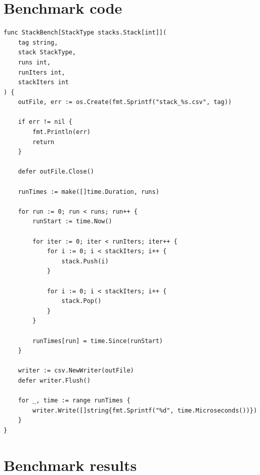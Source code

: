 \documentclass[a4paper,11pt]{article}
\begin{document}
    \begin{appendices}
        \section{Benchmark code}
        \label{appendix:benchmark_code}

        \begin{verbatim}
func StackBench[StackType stacks.Stack[int]](
    tag string,
    stack StackType,
    runs int,
    runIters int,
    stackIters int
) {
    outFile, err := os.Create(fmt.Sprintf("stack_%s.csv", tag))

    if err != nil {
        fmt.Println(err)
        return
    }

    defer outFile.Close()

    runTimes := make([]time.Duration, runs)

    for run := 0; run < runs; run++ {
        runStart := time.Now()

        for iter := 0; iter < runIters; iter++ {
            for i := 0; i < stackIters; i++ {
                stack.Push(i)
            }
    
            for i := 0; i < stackIters; i++ {
                stack.Pop()
            }
        }

        runTimes[run] = time.Since(runStart)
    }

    writer := csv.NewWriter(outFile)
    defer writer.Flush()

    for _, time := range runTimes {
        writer.Write([]string{fmt.Sprintf("%d", time.Microseconds())})
    }
}
        \end{verbatim}

        \section{Benchmark results}
        \label{appendix:results}


\end{appendices}
\end{document}
